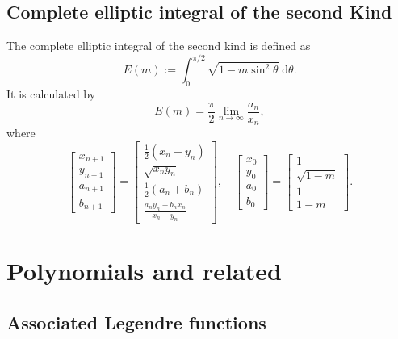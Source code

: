 \documentclass[a4paper,10pt,fleqn]{scrartcl}
\numberwithin{equation}{section}
\begin{document}
\newpage
\subsection{Complete elliptic integral of the second Kind}

The complete elliptic integral of the second kind is defined as
\begin{equation}\label{eq:definition-E}
E(m) := \int_0^{\pi/2} \sqrt{1-m\sin^2\theta}\;\mathrm d\theta.
\end{equation}
It is calculated by
\begin{equation}
E(m) = \frac{\pi}{2}\lim_{n\to\infty}\frac{a_n}{x_n},
\end{equation}
where
\begin{equation}
\begin{bmatrix}
x_{n+1}\\ y_{n+1}\\ a_{n+1}\\ b_{n+1}
\end{bmatrix}
= \begin{bmatrix}
\tfrac{1}{2}(x_n+y_n)\\
\sqrt{x_n y_n}\\
\tfrac{1}{2}(a_n+b_n)\\
\tfrac{a_n y_n+b_n x_n}{x_n+y_n}
\end{bmatrix},\quad
\begin{bmatrix}
x_0\\ y_0\\ a_0\\ b_0
\end{bmatrix}
= \begin{bmatrix}
1\\ \sqrt{1-m}\\ 1\\ 1-m
\end{bmatrix}.
\end{equation}


\newpage
\section{Polynomials and related}
\subsection{Associated Legendre functions}
\end{document}
